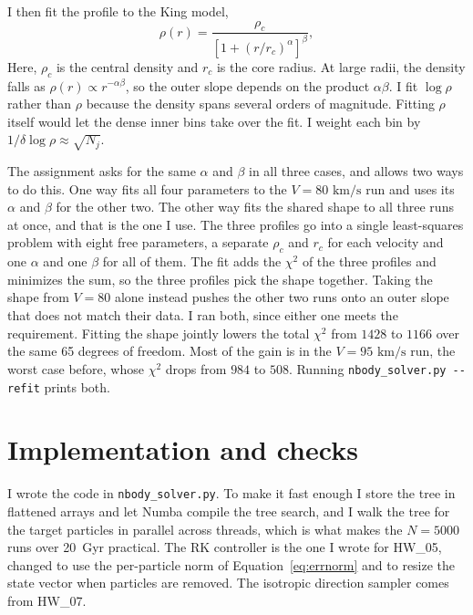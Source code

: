 \documentclass[12pt,a4paper]{article}
\begin{document}
I then fit the profile to the King model,
\begin{equation}\label{eq:king}
    \rho(r)=\frac{\rho_c}{[1+(r/r_c)^\alpha]^\beta},
\end{equation}
Here, $\rho_c$ is the central density and $r_c$ is the core radius. At large radii, the density falls as $\rho(r) \propto r^{-\alpha\beta}$, so the outer slope depends on the product $\alpha\beta$. I fit $\log\rho$ rather than $\rho$ because the density spans several orders of magnitude. Fitting $\rho$ itself would let the dense inner bins take over the fit. I weight each bin by $1/\delta\log\rho \approx \sqrt{N_j}$.

The assignment asks for the same $\alpha$ and $\beta$ in all three cases, and allows two ways to do this. One way fits all four parameters to the $V=80\text{ km/s}$ run and uses its $\alpha$ and $\beta$ for the other two. The other way fits the shared shape to all three runs at once, and that is the one I use. The three profiles go into a single least-squares problem with eight free parameters, a separate $\rho_c$ and $r_c$ for each velocity and one $\alpha$ and one $\beta$ for all of them. The fit adds the $\chi^2$ of the three profiles and minimizes the sum, so the three profiles pick the shape together. Taking the shape from $V=80$ alone instead pushes the other two runs onto an outer slope that does not match their data. I ran both, since either one meets the requirement. Fitting the shape jointly lowers the total $\chi^2$ from $1428$ to $1166$ over the same 65 degrees of freedom. Most of the gain is in the $V=95\text{ km/s}$ run, the worst case before, whose $\chi^2$ drops from $984$ to $508$. Running \texttt{nbody\_solver.py -{}-refit} prints both.

\section{Implementation and checks}\label{sec:implementation}

I wrote the code in \texttt{nbody\_solver.py}. To make it fast enough I store
the tree in flattened arrays and let Numba compile the tree search, and I walk
the tree for the target particles in parallel across threads, which is what
makes the $N=5000$ runs over \SI{20}{Gyr} practical. The RK controller is the
one I wrote for HW\_05, changed to use the per-particle norm of
Equation~\ref{eq:errnorm} and to resize the state vector when particles are
removed. The isotropic direction sampler comes from HW\_07.
\end{document}
